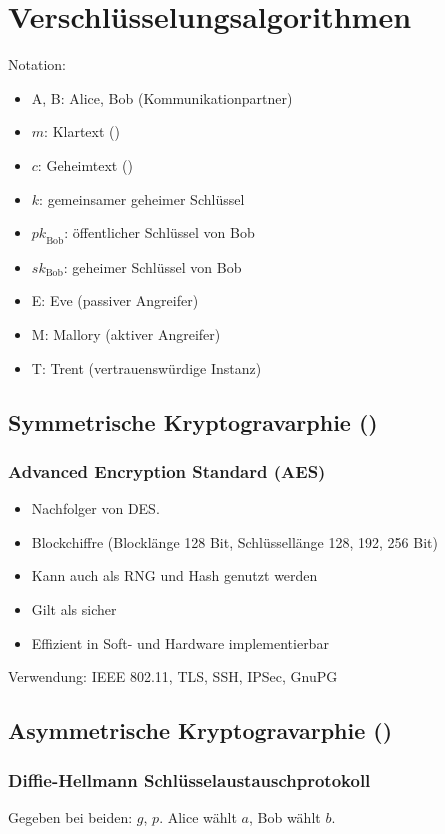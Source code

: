 \section{Verschlüsselungsalgorithmen}
Notation:
\begin{itemize}
    \item A, B: Alice, Bob (Kommunikationpartner)
    \item $m$: Klartext ()
    \item $c$: Geheimtext ()
    \item $k$: gemeinsamer geheimer Schlüssel
    \item ${pk}_\text{Bob}$: öffentlicher Schlüssel von Bob
    \item ${sk}_\text{Bob}$: geheimer Schlüssel von Bob
    \item E: Eve (passiver Angreifer)
    \item M: Mallory (aktiver Angreifer)
    \item T: Trent (vertrauenswürdige Instanz)
\end{itemize}

\subsection{Symmetrische Kryptogravarphie ()}
\subsubsection{Advanced Encryption Standard (AES)}
\begin{itemize}
    \item Nachfolger von DES.
    \item Blockchiffre (Blocklänge 128 Bit, Schlüssellänge 128, 192, 256 Bit)
    \item Kann auch als RNG und Hash genutzt werden
    \item Gilt als sicher
    \item Effizient in Soft- und Hardware implementierbar
\end{itemize}
Verwendung: IEEE 802.11, TLS, SSH, IPSec, GnuPG

\subsection{Asymmetrische Kryptogravarphie ()}
\subsubsection{Diffie-Hellmann Schlüsselaustauschprotokoll}
Gegeben bei beiden: $g$, $p$. Alice wählt $a$, Bob wählt $b$.

